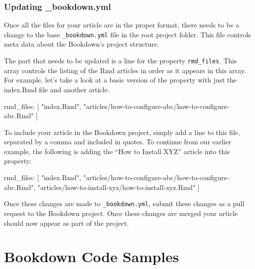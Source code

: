 \documentclass[
]{book}
\newenvironment{Shaded}{\begin{snugshade}}{\end{snugshade}}
\newcommand{\NormalTok}[1]{#1}
\begin{document}
\hypertarget{updating-_bookdown.yml}{%
\subsection{Updating \_bookdown.yml}\label{updating-_bookdown.yml}}

Once all the files for your article are in the proper format, there needs to be a change to the base \texttt{\_bookdown.yml} file in the root project folder. This file controls meta data about the Bookdown's project structure.

The part that needs to be updated is a line for the property \texttt{rmd\_files}. This array controls the listing of the Rmd articles in order as it appears in this array. For example, let's take a look at a basic version of the property with just the index.Rmd file and another article.

\begin{Shaded}
\begin{Highlighting}[numbers=left,,firstnumber=11,]
\NormalTok{rmd\_files: [}
\NormalTok{  "index.Rmd",}
\NormalTok{  "articles/how{-}to{-}configure{-}abc/how{-}to{-}configure{-}abc.Rmd"}
\NormalTok{]}
\end{Highlighting}
\end{Shaded}

To include your article in the Bookdown project, simply add a line to this file, separated by a comma and included in quotes. To continue from our earlier example, the following is adding the ``How to Install XYZ'' article into this property:

\begin{Shaded}
\begin{Highlighting}[numbers=left,,firstnumber=11,]
\NormalTok{rmd\_files: [}
\NormalTok{  "index.Rmd",}
\NormalTok{  "articles/how{-}to{-}configure{-}abc/how{-}to{-}configure{-}abc.Rmd",}
\NormalTok{  "articles/how{-}to{-}install{-}xyz/how{-}to{-}install{-}xyz.Rmd"}
\NormalTok{]}
\end{Highlighting}
\end{Shaded}

Once these changes are made to \texttt{\_bookdown.yml}, submit these changes as a pull request to the Bookdown project. Once these changes are merged your article should now appear as part of the project.

\hypertarget{bookdown-code-samples}{%
\chapter{Bookdown Code Samples}\label{bookdown-code-samples}}
\end{document}

